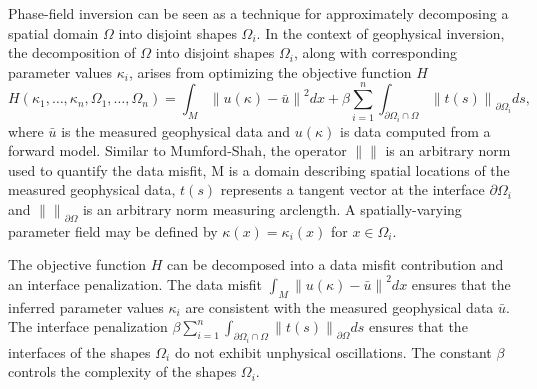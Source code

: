 \documentclass[manuscript,revised]{geophysics}
\newcommand\norm[1]{\left\lVert#1\right\rVert}
\begin{document}
Phase-field inversion can be seen as a technique for approximately decomposing a spatial domain $\Omega$ into disjoint shapes $\Omega_i$.  In the context of geophysical inversion, the decomposition of $\Omega$ into disjoint shapes $\Omega_i$, along with corresponding parameter values $\kappa_i$, arises from optimizing the objective function $H$
\begin{equation} \label{eq:pf}
H \left( \kappa_1,…,\kappa_n, \Omega_1,…,\Omega_n \right) = \int_M \norm{u(\kappa)-\bar{u}}^2 dx+ \beta \sum_{i=1}^n \int_{\partial\Omega_i \cap \Omega} \norm{t(s)}_{\partial\Omega_i} ds ,
\end{equation}
where $\bar{u}$ is the measured geophysical data and $u(\kappa)$ is data computed from a forward model.  Similar to Mumford-Shah, the operator $\norm{}$ is an arbitrary norm used to quantify the data misfit, M is a domain describing spatial locations of the measured geophysical data, $t(s)$ represents a tangent vector at the interface $\partial\Omega_i$ and $\norm{}_{\partial\Omega}$  is an arbitrary norm measuring arclength. A spatially-varying parameter field may be defined by $\kappa(x)=\kappa_i (x)$ for $x \in \Omega_i$.  

The objective function $H$ can be decomposed into a data misfit contribution and an interface penalization. The data misfit $\int_M \norm{u(\kappa)-\bar{u}}^2  dx$
ensures that the inferred parameter values $\kappa_i$ are consistent with the measured geophysical data $\bar{u}$. The interface penalization 
$\beta \sum_{i=1}^n \int_{\partial\Omega_i \cap \Omega} \norm{t(s)}_{\partial\Omega}  ds$
ensures that the interfaces of the shapes $\Omega_i$ do not exhibit unphysical oscillations. The constant $\beta$ controls the complexity of the shapes $\Omega_i$.

\end{document}

